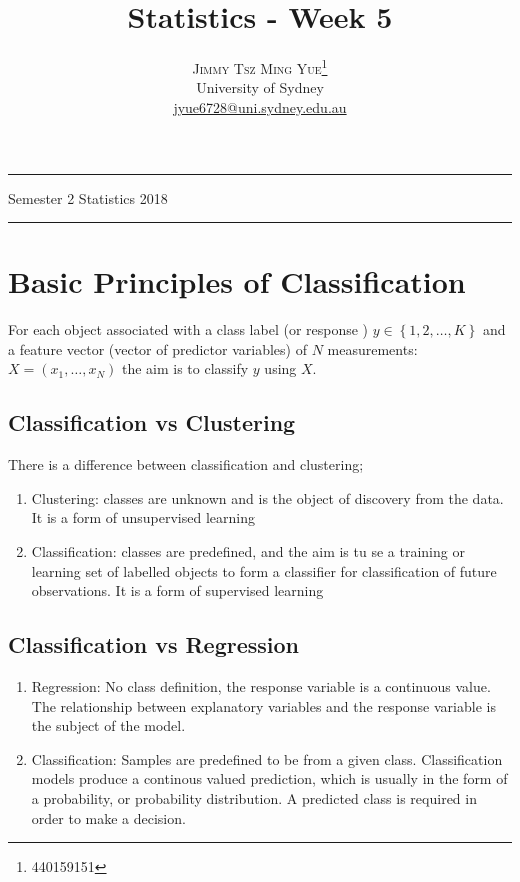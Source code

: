 \documentclass[twoside]{article}
\title{\vspace{-15mm}\fontsize{24pt}{10pt}\selectfont\textbf{Statistics - Week 5}} %
\author{
\large
\textsc{Jimmy Tsz Ming Yue}\thanks{440159151}\\[2mm] %
\normalsize University of Sydney \\ %
\normalsize \href{mailto:jyue6728@uni.sydney.edu.au}{jyue6728@uni.sydney.edu.au} %
\vspace{-5mm}
}
\date{}
\theoremstyle{definition}
\theoremstyle{definition}
\begin{document}


\maketitle %

\thispagestyle{fancy} %
\hrule \smallskip

\noindent Semester 2 \quad Statistics \hspace{10.5
cm} 2018
\smallskip
\hrule
\smallskip
\tableofcontents

\section{Basic Principles of Classification}

For each object associated with a class label (or response ) $y \in \left\{ 1,2, \dots, K  \right\}$ and a feature vector (vector of predictor variables) of $N$ measurements: $X = \left( x_1, \dots, x_N \right)$ the aim is to classify $y$ using $X$. 

\subsection{Classification vs Clustering}

There is a difference between classification and clustering;

\begin{enumerate}
	\item Clustering: classes are unknown and is the object of discovery from the data. It is a form of  unsupervised learning
	\item Classification: classes are predefined, and the aim is tu se a training or learning set of labelled objects to form a classifier for classification of future observations. It is a form of supervised learning
\end{enumerate}


\subsection{Classification vs Regression}

\begin{enumerate}
	\item Regression: No class definition, the response variable is a continuous value. The relationship between explanatory variables and the response variable is the subject of the model.
	\item Classification: Samples are predefined to be from a given class. Classification models produce a continous valued prediction, which is usually in the form of a probability, or probability distribution. A predicted class is required in order to make a decision. 
\end{enumerate}
\end{document}
